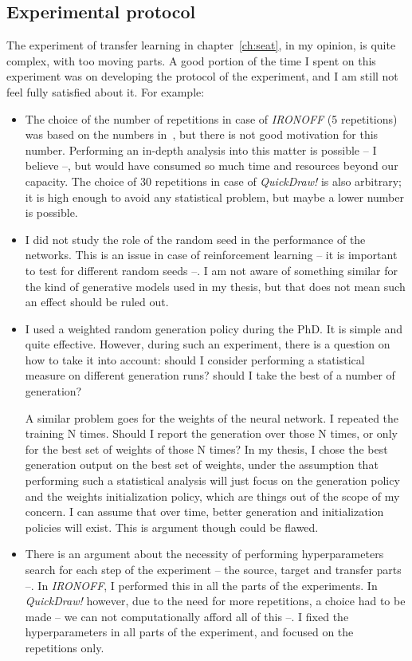   \subsection{Experimental protocol}
    \par The experiment of transfer learning in chapter~\ref{ch:seat}, in my opinion, is quite complex, with too moving parts. A good portion of the time I spent on this experiment was on developing the protocol of the experiment, and I am still not feel fully satisfied about it. For example:
    \begin{itemize}
      \item The choice of the number of repetitions in case of \textit{IRONOFF} (5 repetitions) was based on the numbers in~\citep{8686063}, but there is not good motivation for this number. Performing an in-depth analysis into this matter is possible -- I believe --, but would have consumed so much time and resources beyond our capacity. The choice of 30 repetitions in case of \textit{QuickDraw!} is also arbitrary; it is high enough to avoid any statistical problem, but maybe a lower number is possible.
      \item I did not study the role of the random seed in the performance of the networks. This is an issue in case of reinforcement learning -- it is important to test for different random seeds --. I am not aware of something similar for the kind of generative models used in my thesis, but that does not mean such an effect should be ruled out.
      \item I used a weighted random generation policy during the PhD. It is simple and quite effective. However, during such an experiment, there is a question on how to take it into account: should I consider performing a statistical measure on different generation runs? should I take the best of a number of generation?

      A similar problem goes for the weights of the neural network. I repeated the training N times. Should I report the generation over those N times, or only for the best set of weights of those N times? In my thesis, I chose the best generation output on the best set of weights, under the assumption that performing such a statistical analysis will just focus on the generation policy and the weights initialization policy, which are things out of the scope of my concern. I can assume that over time, better generation and initialization policies will exist. This is argument though could be flawed.

      \item There is an argument about the necessity of performing hyperparameters search for each step of the experiment -- the source, target and transfer parts --. In \textit{IRONOFF}, I performed this in all the parts of the experiments. In \textit{QuickDraw!} however, due to the need for more repetitions, a choice had to be made -- we can not computationally afford all of this --. I fixed the hyperparameters in all parts of the experiment, and focused on the repetitions only.


\end{itemize}
